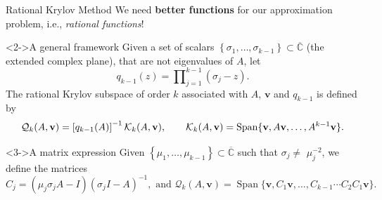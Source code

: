 \documentclass[aspectratio=169,xcolor=dvipsnames]{beamer}
\begin{document}
	\begin{frame}{Rational Krylov Method}
	We need \alert{\textbf{better functions}} for our approximation problem, i.e., \emph{rational functions}!
	
	\begin{block}<2->{A general framework}
		Given a set of scalars $\left\{ \sigma _{1},\dots,\sigma _{k-1}\right\}
		\subset \overline{\mathbb{C}}$ (the extended complex plane), that are not
		eigenvalues of $A$, let
		\begin{equation*}
			q_{k-1}(z)=\prod\nolimits_{j=1}^{k-1}(\sigma _{j}-z).
		\end{equation*}
		The \alert{rational Krylov} subspace of order $k$ associated with $A$, $\mathbf{v%
		}$ and $q_{k-1}$ is defined by%
		\begin{equation*}
			\mathcal{Q}_{k}(A,\mathbf{v})=\left[ q_{k-1}(A)\right] ^{-1}\mathcal{%
				K}_{k}(A,\mathbf{v}),
			\qquad \mathcal{K}_{k}(A,\mathbf{v})=\operatorname{Span}\{\mathbf{v},A\mathbf{v}%
			,\ldots ,A^{k-1}\mathbf{v}\}.
		\end{equation*}
	\end{block}

\begin{block}<3->{A matrix expression}
	Given $\left\{ \mu _{1},\dots, \mu _{k-1}\right\} \subset \overline{\mathbb{C}}$
	such that $\sigma _{j}\neq $ $\mu _{j}^{-2}$, we define the matrices
	\begin{equation*}
		C_{j}=\left( \mu _{j}\sigma _{j}A-I\right) (\sigma _{j}I-A)^{-1}, \text{ and } \mathcal{Q}_{k}(A,\mathbf{v})=\operatorname{Span}\{\mathbf{v},C_{1}\mathbf{v}%
		,\ldots ,C_{k-1}\cdots C_2 C_{1}\mathbf{v}\}.
	\end{equation*}
\end{block}

	\end{frame}
\end{document}
